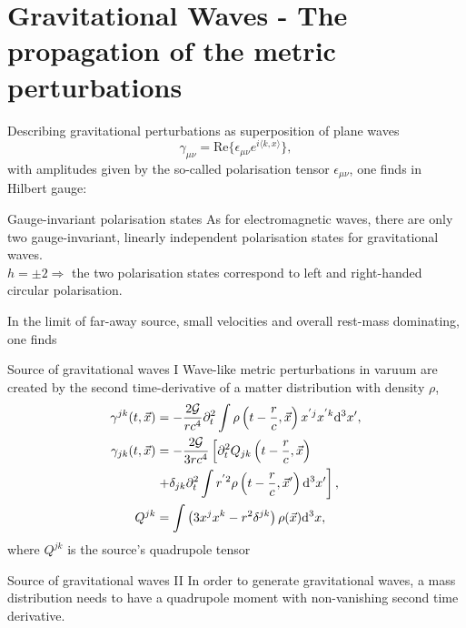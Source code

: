 \section{Gravitational Waves - The propagation of the metric perturbations}
Describing gravitational perturbations as superposition of plane waves
\begin{equation}
	\gamma_{\mu \nu} = \mathrm{Re}\{ \epsilon_{\mu \nu} e^{i \langle k,x\rangle} \},
\end{equation}
with amplitudes given by the so-called polarisation tensor $\epsilon_{\mu \nu}$, one finds in Hilbert gauge:
\begin{mybox}{Gauge-invariant polarisation states}
	As for electromagnetic waves, there are only two gauge-invariant, linearly independent polarisation states for gravitational waves.\\
	$h=\pm 2 \Rightarrow$ the two polarisation states correspond to left and right-handed circular polarisation.
\end{mybox}
In the limit of far-away source, small velocities and overall rest-mass dominating, one finds 
\begin{mybox}{Source of gravitational waves I}
	Wave-like metric perturbations in varuum are created by the second time-derivative of a matter distribution with density $\rho$,
	\begin{align}
		\gamma^{jk} (t,\vec{x}) &= -\frac{2\mathcal{G}}{r c^4} \partial^2_t \int \rho \left(t-\frac{r}{c}, \vec{x}\right) x^{'j} x^{'k} \mathrm{d}^3 x', \\
		\gamma_{jk}(t,\vec{x}) &= -\frac{2 \mathcal{G}}{3 r c^4} \left[\partial^2_t Q_{jk} \left(t-\frac{r}{c}, \vec{x}\right) \right. \nonumber \\
		&\left. + \delta_{jk} \partial^2_t \int r^{'2} \rho \left(t-\frac{r}{c}, \vec{x}'\right) \mathrm{d}^3 x'\right],\\
		Q^{jk} &= \int \left(3 x^j x^k -r^2 \delta^{jk} \right) \rho(\vec{x}) \mathrm{d}^3x,
	\end{align}
where $Q^{jk}$ is the source's quadrupole tensor
\end{mybox}
\begin{mybox}{Source of gravitational waves II}
	In order to generate gravitational waves, a mass distribution needs to have a quadrupole moment with non-vanishing second time derivative.
\end{mybox}
